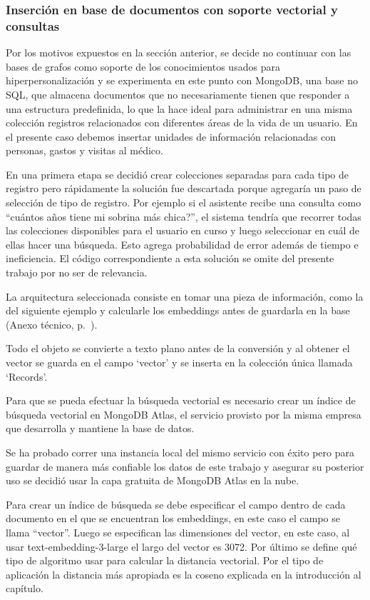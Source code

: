 \subsubsection{Inserción en base de documentos con soporte vectorial y consultas}

Por los motivos expuestos en la sección anterior, se decide no continuar con las bases de grafos como soporte de los conocimientos usados para hiperpersonalización y se experimenta en este punto con MongoDB, una base no SQL, que almacena documentos que no necesariamente tienen que responder a una estructura predefinida, lo que la hace ideal para administrar en una misma colección registros relacionados con diferentes áreas de la vida de un usuario. En el presente caso debemos insertar unidades de información relacionadas con personas, gastos y visitas al médico.

En una primera etapa se decidió crear colecciones separadas para cada tipo de registro pero rápidamente la solución fue descartada porque agregaría un paso de selección de tipo de registro. Por ejemplo si el asistente recibe una consulta como ``cuántos años tiene mi sobrina más chica?'', el sistema tendría que recorrer todas las colecciones disponibles para el usuario en curso y luego seleccionar en cuál de ellas hacer una búsqueda. Esto agrega probabilidad de error además de tiempo e ineficiencia. El código correspondiente a esta solución se omite del presente trabajo por no ser de relevancia.

La arquitectura seleccionada consiste en tomar una pieza de información, como la del siguiente ejemplo y calcularle los embeddings antes de guardarla en la base (Anexo técnico, p.~\pageref{anexo:code-4-4-2-1}).

Todo el objeto se convierte a texto plano antes de la conversión y al obtener el vector se guarda en el campo `vector' y se inserta en la colección única llamada `Records'.

Para que se pueda efectuar la búsqueda vectorial es necesario crear un índice de búsqueda vectorial en MongoDB Atlas, el servicio provisto por la misma empresa que desarrolla y mantiene la base de datos.

Se ha probado correr una instancia local del mismo servicio con éxito pero para guardar de manera más confiable los datos de este trabajo y asegurar su posterior uso se decidió usar la capa gratuita de MongoDB Atlas en la nube.

Para crear un índice de búsqueda se debe especificar el campo dentro de cada documento en el que se encuentran los embeddings, en este caso el campo se llama ``vector''. Luego se especifican las dimensiones del vector, en este caso, al usar text-embedding-3-large el largo del vector es 3072. Por último se define qué tipo de algoritmo usar para calcular la distancia vectorial. Por el tipo de aplicación la distancia más apropiada es la coseno explicada en la introducción al capítulo.

